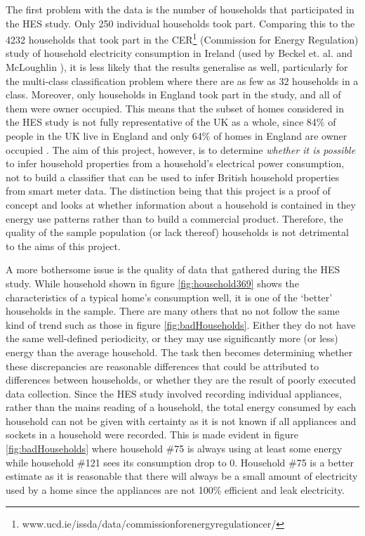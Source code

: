 The first problem with the data is the number of households that participated in the HES study. Only 250 individual households took part. Comparing this to the 4232 households that took part in the CER\footnote{www.ucd.ie/issda/data/commissionforenergyregulationcer/} (Commission for Energy Regulation) study of household electricity consumption in Ireland (used by  Beckel et. al. and McLoughlin \cite{Beckel_1,Beckel_2,Beckel_3,McLoughlin}), it is less likely that the results generalise as well, particularly for the multi-class classification problem where there are as few as 32 households in a class. Moreover, only households in England took part in the study, and all of them were owner occupied. This means that the subset of homes considered in the HES study is not fully representative of the UK as a whole, since 84\% of people in the UK live in England and only 64\% of homes in England are owner occupied \cite{ONS}. The aim of this project, however, is to determine \textit{whether it is possible} to infer household properties from a household's electrical power consumption, not to build a classifier that can be used to infer British household properties from smart meter data. The distinction being that this project is a proof of concept and looks at whether information about a household is contained in they energy use patterns rather than to build a commercial product. Therefore, the quality of the sample population (or lack thereof) households is not detrimental to the aims of this project.

A more bothersome issue is the quality of data that gathered during the HES study. While household shown in figure \ref{fig:household369} shows the characteristics of a typical home's consumption well, it is one of the `better' households in the sample. There are many others that no not follow the same kind of trend such as those in figure \ref{fig:badHouseholds}. Either they do not have the same well-defined periodicity, or they may use significantly more (or less) energy than the average household. The task then becomes determining whether these discrepancies are reasonable differences that could be attributed to differences between households, or whether they are the result of poorly executed data collection. Since the HES study involved recording individual appliances, rather than the mains reading of a household, the total energy consumed by each household can not be given with certainty as it is not known if all appliances and sockets in a household were recorded. This is made evident in figure \ref{fig:badHouseholds} where household \#75 is always using at least some energy while household \#121 sees its consumption drop to 0. Household \#75 is a better estimate as it is reasonable that there will always be a small amount of electricity used by a home since the appliances are not 100\% efficient and leak electricity.

